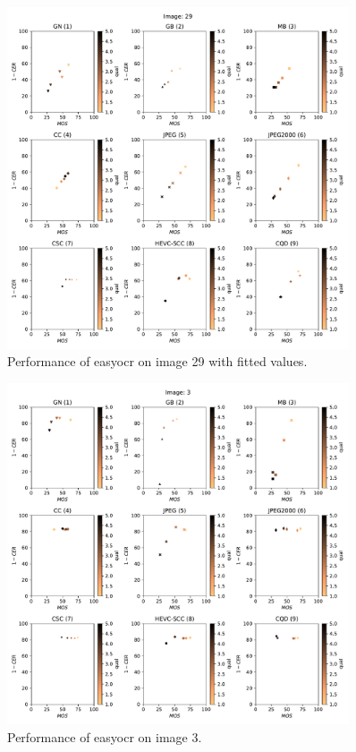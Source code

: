 \begin{figure}[h]
\centering
\includegraphics[width=0.9\textwidth]{../../images/analyze/mos_ter_fit_ezocr_sub_img29.pdf}
\caption{Performance of easyocr on image 29 with fitted values.}
\label{fig:sub29_fit}
\end{figure}

\begin{figure}[h]
\centering
\includegraphics[width=0.9\textwidth]{../../images/analyze/mos_ter_ezocr_sub_img3.pdf}
\caption{Performance of easyocr on image 3.}
\label{fig:sub3}
\end{figure}

